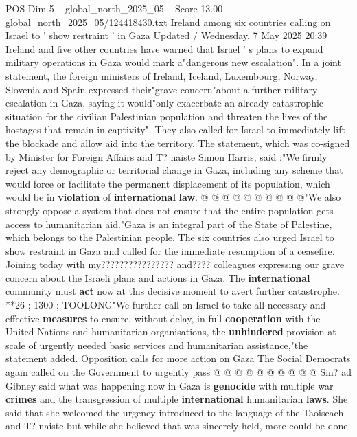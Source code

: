 \begin{textsample}{POS Dim 5 – global\_north\_2025\_05 – Score 13.00 – global\_north\_2025\_05/124418430.txt}  \label{ex:f5_pos_138}
Ireland among six countries calling on Israel to ' show restraint ' in Gaza Updated / Wednesday, 7 May 2025 20:39 Ireland and five other countries have warned that Israel ' s plans to expand military operations in Gaza would mark a"dangerous new escalation".
In a joint statement, the foreign ministers of Ireland, Iceland, Luxembourg, Norway, Slovenia and Spain expressed their"grave concern"about a further military escalation in Gaza, saying it would"only exacerbate an already catastrophic situation for the civilian Palestinian population and threaten the lives of the hostages that remain in captivity".
They also called for Israel to immediately lift the blockade and allow aid into the territory.
The statement, which was co-signed by Minister for Foreign Affairs and T? naiste Simon Harris, said :"We firmly reject any demographic or territorial change in Gaza, including any scheme that would force or facilitate the permanent displacement of its population, which would be in \textbf{violation} of \textbf{international} \textbf{law}. @ @ @ @ @ @ @ @ @ @"We also strongly oppose a system that does not ensure that the entire population gets access to humanitarian aid."Gaza is an integral part of the State of Palestine, which belongs to the Palestinian people.
The six countries also urged Israel to show restraint in Gaza and called for the immediate resumption of a ceasefire.
Joining today with my???????????????? and???? colleagues expressing our grave concern about the Israeli plans and actions in Gaza.
The \textbf{international} community must \textbf{act} now at this decisive moment to avert further catastrophe. **26 ; 1300 ; TOOLONG"We further call on Israel to take all necessary and effective \textbf{measures} to ensure, without delay, in full \textbf{cooperation} with the United Nations and humanitarian organisations, the \textbf{unhindered} provision at scale of urgently needed basic services and humanitarian assistance,"the statement added.
Opposition calls for more action on Gaza The Social Democrats again called on the Government to urgently pass @ @ @ @ @ @ @ @ @ @ Sin? ad Gibney said what was happening now in Gaza is \textbf{genocide} with multiple war \textbf{crimes} and the transgression of multiple \textbf{international} humanitarian \textbf{laws}.
She said that she welcomed the urgency introduced to the language of the Taoiseach and T? naiste but while she believed that was sincerely held, more could be done.

\end{textsample}
